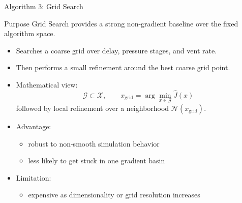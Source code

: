 \documentclass[aspectratio=169]{beamer}
\begin{document}
\begin{frame}{Algorithm 3: Grid Search}
  \small
  \begin{block}{Purpose}
    Grid Search provides a strong non-gradient baseline over the fixed algorithm space.
  \end{block}

  \begin{itemize}
    \item Searches a coarse grid over delay, pressure stages, and vent rate.
    \item Then performs a small refinement around the best coarse grid point.
    \item Mathematical view:
    \[
    \mathcal{G} \subset \mathcal{X}, \qquad
    x_{\mathrm{grid}} = \arg\min_{x \in \mathcal{G}} \hat{J}(x)
    \]
    followed by local refinement over a neighborhood \(\mathcal{N}(x_{\mathrm{grid}})\).
    \item Advantage:
    \begin{itemize}
      \item robust to non-smooth simulation behavior
      \item less likely to get stuck in one gradient basin
    \end{itemize}
    \item Limitation:
    \begin{itemize}
      \item expensive as dimensionality or grid resolution increases
    \end{itemize}
  \end{itemize}
\end{frame}
\end{document}
